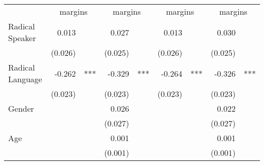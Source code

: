 \documentclass{article}
\begin{document}
\begin{table}[!h]
\centering
\begin{tabular}{lllllllll}
\cline{1-9}
\multicolumn{1}{r}{} &
  \multicolumn{2}{c}{margins} &
  \multicolumn{2}{c}{margins} &
  \multicolumn{2}{c}{margins} &
  \multicolumn{2}{c}{margins} \\
\cline{1-9}
\multicolumn{1}{l}{Radical Speaker} &
  \multicolumn{1}{r}{0.013} &
  \multicolumn{1}{l}{} &
  \multicolumn{1}{r}{0.027} &
  \multicolumn{1}{l}{} &
  \multicolumn{1}{r}{0.013} &
  \multicolumn{1}{l}{} &
  \multicolumn{1}{r}{0.030} &
  \multicolumn{1}{l}{} \\
\multicolumn{1}{l}{} &
  \multicolumn{1}{r}{(0.026)} &
  \multicolumn{1}{l}{} &
  \multicolumn{1}{r}{(0.025)} &
  \multicolumn{1}{l}{} &
  \multicolumn{1}{r}{(0.026)} &
  \multicolumn{1}{l}{} &
  \multicolumn{1}{r}{(0.025)} &
  \multicolumn{1}{l}{} \\
\multicolumn{1}{l}{Radical Language} &
  \multicolumn{1}{r}{-0.262} &
  \multicolumn{1}{l}{***} &
  \multicolumn{1}{r}{-0.329} &
  \multicolumn{1}{l}{***} &
  \multicolumn{1}{r}{-0.264} &
  \multicolumn{1}{l}{***} &
  \multicolumn{1}{r}{-0.326} &
  \multicolumn{1}{l}{***} \\
\multicolumn{1}{l}{} &
  \multicolumn{1}{r}{(0.023)} &
  \multicolumn{1}{l}{} &
  \multicolumn{1}{r}{(0.023)} &
  \multicolumn{1}{l}{} &
  \multicolumn{1}{r}{(0.023)} &
  \multicolumn{1}{l}{} &
  \multicolumn{1}{r}{(0.023)} &
  \multicolumn{1}{l}{} \\
\multicolumn{1}{l}{Gender} &
  \multicolumn{1}{r}{} &
  \multicolumn{1}{l}{} &
  \multicolumn{1}{r}{0.026} &
  \multicolumn{1}{l}{} &
  \multicolumn{1}{r}{} &
  \multicolumn{1}{l}{} &
  \multicolumn{1}{r}{0.022} &
  \multicolumn{1}{l}{} \\
\multicolumn{1}{l}{} &
  \multicolumn{1}{r}{} &
  \multicolumn{1}{l}{} &
  \multicolumn{1}{r}{(0.027)} &
  \multicolumn{1}{l}{} &
  \multicolumn{1}{r}{} &
  \multicolumn{1}{l}{} &
  \multicolumn{1}{r}{(0.027)} &
  \multicolumn{1}{l}{} \\
\multicolumn{1}{l}{Age} &
  \multicolumn{1}{r}{} &
  \multicolumn{1}{l}{} &
  \multicolumn{1}{r}{0.001} &
  \multicolumn{1}{l}{} &
  \multicolumn{1}{r}{} &
  \multicolumn{1}{l}{} &
  \multicolumn{1}{r}{0.001} &
  \multicolumn{1}{l}{} \\
\multicolumn{1}{l}{} &
  \multicolumn{1}{r}{} &
  \multicolumn{1}{l}{} &
  \multicolumn{1}{r}{(0.001)} &
  \multicolumn{1}{l}{} &
  \multicolumn{1}{r}{} &
  \multicolumn{1}{l}{} &
  \multicolumn{1}{r}{(0.001)} &
  \multicolumn{1}{l}{} \\

\end{tabular}
\end{table}
\end{document}
